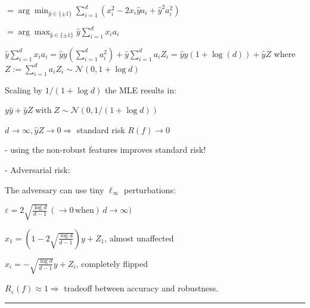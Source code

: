 $=\arg\operatorname*{min}_{{\hat{y}}\in\{\pm1\}}\sum_{i=1}^{d}(x_{i}^{2}-2x_{i}\hat{y}a_{i}+\hat{y}^{2}a_{i}^{2})$

$=\arg\operatorname*{max}_{\hat{y}\in\{\pm1\}}{\hat{y}}\sum_{i=1}^{d}x_{i}a_{i}$

${\hat{y}}\sum_{i=1}^{d}x_{i}a_{i}=\hat{y}y(\sum_{i=1}^{d}a_{i}^{2})+\hat{y}\sum_{i=1}^{d}a_{i}Z_{i}=\hat{y}y(1+\log(d))+\hat{y}Z$ where $Z:=\textstyle\sum_{i=1}^{d}a_{i}Z_{i}\sim{\mathcal{N}}(0,1+\log d)$

Scaling by $1/(1+\log d)$ the MLE results in:

$y{\hat{y}}+{\hat{y}}Z\operatorname{with}Z\sim{\mathcal{N}}(0,1/(1+\log d))$

$d\rightarrow\infty,{\hat{y}}Z\rightarrow0 \Rightarrow$ standard risk $R(f) \rightarrow 0$ 

- using the non-robust features improves standard risk!

- Adversarial risk:

The adversary can use tiny $\ell_\infty$ perturbations:

$\varepsilon=2\sqrt{\frac{\log d}{d-1}}\,(\to0\,\mathrm{when})\,d\to\infty)$

${\hat{x}}_{1}=\left(1-2\sqrt{\frac{\log d}{d-1}}\right)y+Z_{1}$, almost unaffected

$\hat{x}_{i}=-\sqrt{\frac{\log d}{d-1}}y+Z_{i}$, completely flipped

$R_{\varepsilon}(f) \approx 1 \Rightarrow$ tradeoff between accuracy and robustness.

\vspace{4pt}
\hrule
\vspace{4pt}